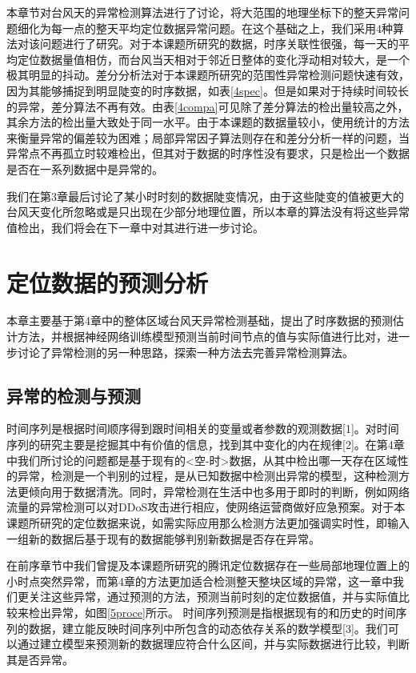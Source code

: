\documentclass[a4paper,AutoFakeBold,oneside,12pt]{book}
\begin{document}
	本章节对台风天的异常检测算法进行了讨论，将大范围的地理坐标下的整天异常问题细化为每一点的整天平均定位数据异常问题。在这个基础之上，我们采用4种算法对该问题进行了研究。对于本课题所研究的数据，时序关联性很强，每一天的平均定位数据量值相仿，而台风当天相对于邻近日整体的变化浮动相对较大，是一个极其明显的抖动。差分分析法对于本课题所研究的范围性异常检测问题快速有效，因为其能够捕捉到明显陡变的时序数据，如表\ref{4spec}。但是如果对于持续时间较长的异常，差分算法不再有效。由表\ref{4compa}可见除了差分算法的检出量较高之外，其余方法的检出量大致处于同一水平。由于本课题的数据量较小，使用统计的方法来衡量异常的偏差较为困难；局部异常因子算法则存在和差分分析一样的问题，当异常点不再孤立时较难检出，但其对于数据的时序性没有要求，只是检出一个数据是否在一系列数据中是异常的。


	我们在第3章最后讨论了某小时时刻的数据陡变情况，由于这些陡变的值被更大的台风天变化所忽略或是只出现在少部分地理位置，所以本章的算法没有将这些异常值检出，我们将会在下一章中对其进行进一步讨论。

\chapter{定位数据的预测分析}
	本章主要基于第4章中的整体区域台风天异常检测基础，提出了时序数据的预测估计方法，并根据神经网络训练模型预测当前时间节点的值与实际值进行比对，进一步讨论了异常检测的另一种思路，探索一种方法去完善异常检测算法。

\section{异常的检测与预测}
	时间序列是根据时间顺序得到跟时间相关的变量或者参数的观测数据[1]。对时间序列的研究主要是挖掘其中有价值的信息，找到其中变化的内在规律[2]。在第4章中我们所讨论的问题都是基于现有的<空-时>数据，从其中检出哪一天存在区域性的异常，检测是一个判别的过程，是从已知数据中检测出异常的模型，这种检测方法更倾向用于数据清洗。同时，异常检测在生活中也多用于即时的判断，例如网络流量的异常检测可以对DDoS攻击进行相应，使网络运营商做好应急预案。对于本课题所研究的定位数据来说，如需实际应用那么检测方法更加强调实时性，即输入一组新的数据后基于现有的数据能够判别新数据是否存在异常。


	在前序章节中我们曾提及本课题所研究的腾讯定位数据存在一些局部地理位置上的小时点突然异常，而第4章的方法更加适合检测整天整块区域的异常，这一章中我们更关注这些异常，通过预测的方法，预测当前时刻的定位数据值，并与实际值比较来检出异常，如图\ref{5proce}所示。
	时间序列预测是指根据现有的和历史的时间序列的数据，建立能反映时间序列中所包含的动态依存关系的数学模型[3]。我们可以通过建立模型来预测新的数据理应符合什么区间，并与实际数据进行比较，判断其是否异常。
\end{document}

